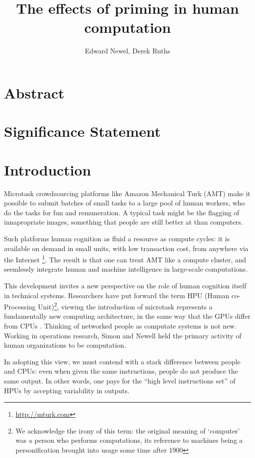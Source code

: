 \documentclass[a4paper]{report}
\title{The effects of priming in human computation}
\author{Edward Newel, Derek Ruths}
\begin{document}
\maketitle
\section*{Abstract}
\section*{Significance Statement}
\section*{Introduction}

Microtask crowdsourcing platforms like Amazon Mechanical Turk (AMT) make it 
possible to submit batches of small tasks to a large pool of human workers, 
who do the tasks for fun and remuneration.  A typical task might be the 
flagging of innapropriate images, something that people are still better at 
than computers.

Such platforms human cognition as fluid a resource as compute cycles: it is 
available on demand in small units, with low transaction cost, from anywhere 
via the Internet \footnote{\href{http://mturk.com}{http://mturk.com}}.  The 
result is that one can treat AMT like a compute cluster, and seemlessly 
integrate human and machine intelligence in large-scale computations.

This development invites a new perspective on the role of human cognition 
itself in technical systems.  Researchers have put forward the term HPU 
(Human co-Processing Unit)\footnote{We acknowledge the irony of this term:
the original meaning of `computer' was a person who performs computations,
its reference to machines being a personification brought into usage some time
after 1900}, viewing the introduction of 
microtask represents a fundamentally new computing architecture, in the same
way that the GPUs differ from CPUs \cite{5543192}.  Thinking of networked 
people as computate systems is not new.  Working in operations research, Simon 
and Newell held the primary activity of human organizations to be 
computation\cite{Simon:1958fp}. 

In adopting this view, we must contend with a stark difference between 
people and CPUs: even when given the same instructions, people do not produce
the same output.  In other words, one pays for the ``high level instructions 
set'' of HPUs by accepting variability in outputs.
\end{document}
